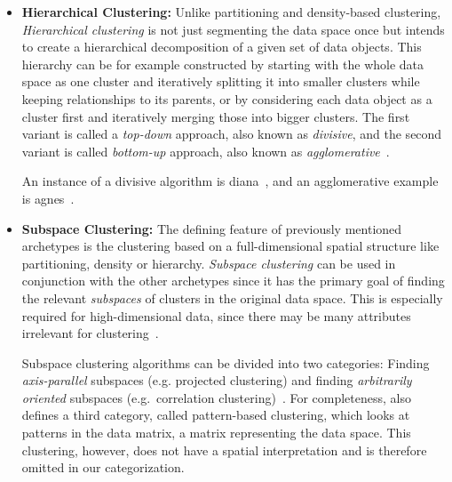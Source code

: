 \begin{itemize}
    \item \textbf{Hierarchical Clustering:} Unlike partitioning and density-based clustering, \textit{Hierarchical clustering} is not just segmenting the data space once but intends to create a hierarchical decomposition of a given set of data objects. This hierarchy can be for example constructed by starting with the whole data space as one cluster and iteratively splitting it into smaller clusters while keeping relationships to its parents, or by considering each data object as a cluster first and iteratively merging those into bigger clusters. The first variant is called a \textit{top-down} approach, also known as \textit{divisive}, and the second variant is called \textit{bottom-up} approach, also known as \textit{agglomerative}~\cite[Ch.10.3]{han2011data}. 
    
    An instance of a divisive algorithm is \acrshort{diana}~\cite[Ch.6]{kaufman2009finding}, and an agglomerative example is \acrshort{agnes}~\cite[Ch.5]{kaufman2009finding}.
    
    
    \item \textbf{Subspace Clustering:} The defining feature of previously mentioned archetypes is the clustering based on a full-dimensional spatial structure like partitioning, density or hierarchy. \textit{Subspace clustering} can be used in conjunction with the other archetypes since it has the primary goal of finding the relevant \textit{subspaces} of clusters in the original data space. This is especially required for high-dimensional data, since there may be many attributes irrelevant for clustering~\cite{vidal2011subspace}. 
    
    Subspace clustering algorithms can be divided into two categories: Finding \textit{axis-parallel} subspaces (e.g. projected clustering) and finding \textit{arbitrarily oriented} subspaces (e.g.\ correlation clustering)~\cite[Ch.3]{zimek2009correlation}.
    For completeness, \textcite{zimek2009correlation} also defines a third category, called pattern-based clustering, which looks at patterns in the data matrix, a matrix representing the data space. This clustering, however, does not have a spatial interpretation and is therefore omitted in our categorization.
    

\end{itemize}
